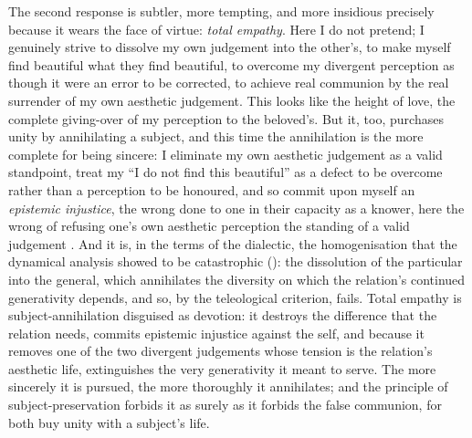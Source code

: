 The second response is subtler, more tempting, and more insidious precisely because it wears the face of virtue: \emph{total empathy}. Here I do not pretend; I genuinely strive to dissolve my own judgement into the other's, to make myself find beautiful what they find beautiful, to overcome my divergent perception as though it were an error to be corrected, to achieve real communion by the real surrender of my own aesthetic judgement. This looks like the height of love, the complete giving-over of my perception to the beloved's. But it, too, purchases unity by annihilating a subject, and this time the annihilation is the more complete for being sincere: I eliminate my own aesthetic judgement as a valid standpoint, treat my ``I do not find this beautiful'' as a defect to be overcome rather than a perception to be honoured, and so commit upon myself an \emph{epistemic injustice}, the wrong done to one in their capacity as a knower, here the wrong of refusing one's own aesthetic perception the standing of a valid judgement \parencite{fricker2007}. And it is, in the terms of the dialectic, the homogenisation that the dynamical analysis showed to be catastrophic (): the dissolution of the particular into the general, which annihilates the diversity on which the relation's continued generativity depends, and so, by the teleological criterion, fails. Total empathy is subject-annihilation disguised as devotion: it destroys the difference that the relation needs, commits epistemic injustice against the self, and because it removes one of the two divergent judgements whose tension is the relation's aesthetic life, extinguishes the very generativity it meant to serve. The more sincerely it is pursued, the more thoroughly it annihilates; and the principle of subject-preservation forbids it as surely as it forbids the false communion, for both buy unity with a subject's life.

